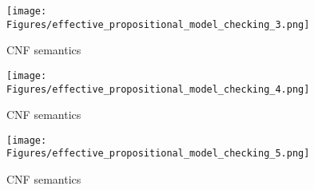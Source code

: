 \begin{figure}[H]
    \centering
    \texttt{[image: Figures/effective\_propositional\_model\_checking\_3.png]}
    \caption{CNF semantics}
    \label{fig:CNF}
\end{figure}

\begin{figure}[H]
    \centering
    \texttt{[image: Figures/effective\_propositional\_model\_checking\_4.png]}
    \caption{CNF semantics}
    \label{fig:CNF}
\end{figure}


\begin{figure}[H]
    \centering
    \texttt{[image: Figures/effective\_propositional\_model\_checking\_5.png]}
    \caption{CNF semantics}
    \label{fig:CNF}
\end{figure}
















